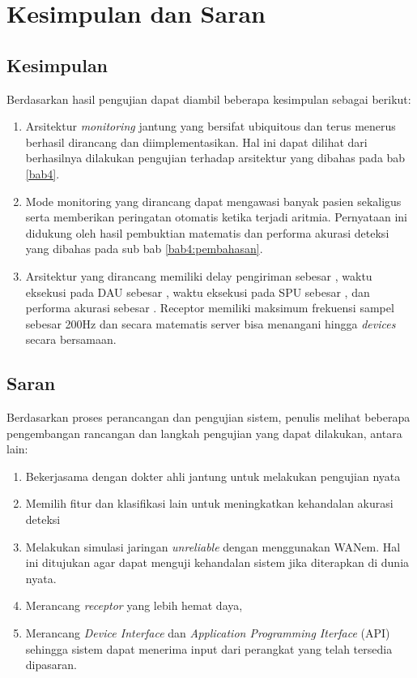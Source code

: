 \chapter{Kesimpulan dan Saran}
\section{Kesimpulan}
Berdasarkan hasil pengujian dapat diambil beberapa kesimpulan sebagai berikut:

\begin{enumerate}
	\item Arsitektur \textit{monitoring} jantung yang bersifat ubiquitous dan terus menerus berhasil dirancang dan diimplementasikan. Hal ini dapat dilihat dari berhasilnya dilakukan pengujian terhadap arsitektur yang dibahas pada bab \ref{bab4}.
	\item Mode monitoring yang dirancang dapat mengawasi banyak pasien sekaligus serta memberikan peringatan otomatis ketika terjadi aritmia. Pernyataan ini didukung oleh hasil pembuktian matematis dan performa akurasi deteksi yang dibahas pada sub bab \ref{bab4:pembahasan}.
	\item Arsitektur yang dirancang memiliki delay pengiriman sebesar \delay, waktu eksekusi pada DAU sebesar \exec, waktu eksekusi pada SPU sebesar \execs, dan performa akurasi sebesar \accuracy. Receptor memiliki maksimum frekuensi sampel sebesar 200Hz dan secara matematis server bisa menangani hingga \sensor \textit{devices} secara bersamaan.
\end{enumerate}

\section{Saran}
Berdasarkan proses perancangan dan pengujian sistem, penulis melihat beberapa pengembangan rancangan dan langkah pengujian yang dapat dilakukan, antara lain:
\begin{enumerate}
	\item Bekerjasama dengan dokter ahli jantung untuk melakukan pengujian nyata
	\item Memilih fitur dan klasifikasi lain untuk meningkatkan kehandalan akurasi deteksi	
	\item Melakukan simulasi jaringan \textit{unreliable} dengan menggunakan WANem. Hal ini ditujukan agar dapat menguji kehandalan sistem jika diterapkan di dunia nyata.
	\item Merancang \textit{receptor} yang lebih hemat daya,
	\item Merancang \textit{Device Interface} dan \textit{Application Programming Iterface} (API) sehingga sistem dapat menerima input dari perangkat yang telah tersedia dipasaran.
\end{enumerate}